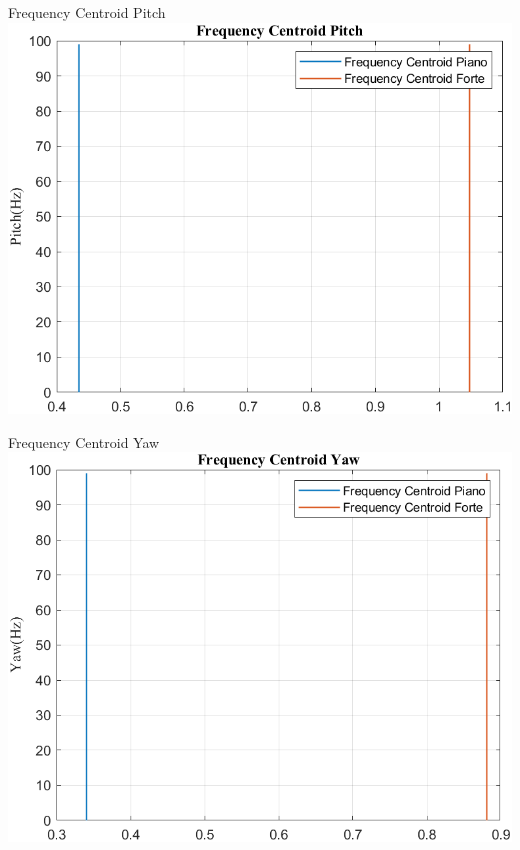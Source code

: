 \documentclass[beamer]{standalone}
\begin{document}
	\begin{frame}{{Frequency Centroid Pitch}}
		\centering\includegraphics[height=.8\textheight]{figure/VAng/Trasformata/Frequency CentroidPitch}
	\end{frame}
	
	\begin{frame}{{Frequency Centroid Yaw}}
		\centering\includegraphics[height=.8\textheight]{figure/VAng/Trasformata/Frequency CentroidYaw}
	\end{frame}
	
\end{document}
